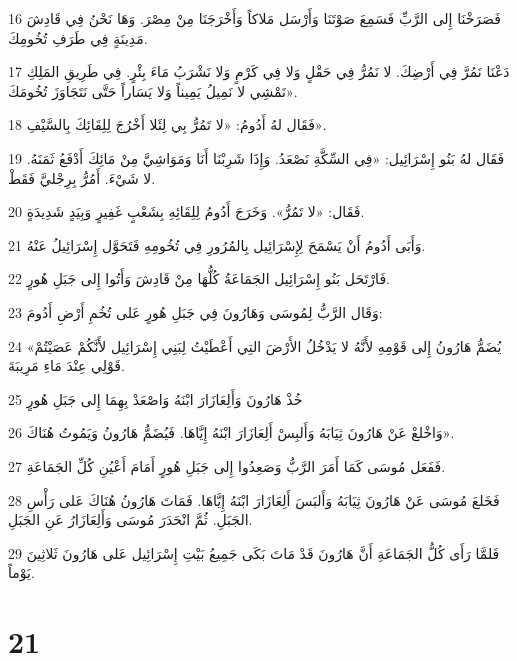 \par 16 فَصَرَخْنَا إِلى الرَّبِّ فَسَمِعَ صَوْتَنَا وَأَرْسَل مَلاكاً وَأَخْرَجَنَا مِنْ مِصْرَ. وَهَا نَحْنُ فِي قَادِشَ مَدِينَةٍ فِي طَرَفِ تُخُومِكَ.
\par 17 دَعْنَا نَمُرَّ فِي أَرْضِكَ. لا نَمُرُّ فِي حَقْلٍ وَلا فِي كَرْمٍ وَلا نَشْرَبُ مَاءَ بِئْرٍ. فِي طَرِيقِ المَلِكِ نَمْشِي لا نَمِيلُ يَمِيناً وَلا يَسَاراً حَتَّى نَتَجَاوَزَ تُخُومَكَ».
\par 18 فَقَال لهُ أَدُومُ: «لا تَمُرُّ بِي لِئَلا أَخْرُجَ لِلِقَائِكَ بِالسَّيْفِ».
\par 19 فَقَال لهُ بَنُو إِسْرَائِيل: «فِي السِّكَّةِ نَصْعَدُ. وَإِذَا شَرِبْنَا أَنَا وَمَوَاشِيَّ مِنْ مَائِكَ أَدْفَعُ ثَمَنَهُ. لا شَيْءَ. أَمُرُّ بِرِجْليَّ فَقَطْ.
\par 20 فَقَال: «لا تَمُرُّ». وَخَرَجَ أَدُومُ لِلِقَائِهِ بِشَعْبٍ غَفِيرٍ وَبِيَدٍ شَدِيدَةٍ.
\par 21 وَأَبَى أَدُومُ أَنْ يَسْمَحَ لِإِسْرَائِيل بِالمُرُورِ فِي تُخُومِهِ فَتَحَوَّل إِسْرَائِيلُ عَنْهُ.
\par 22 فَارْتَحَل بَنُو إِسْرَائِيل الجَمَاعَةُ كُلُّهَا مِنْ قَادِشَ وَأَتُوا إِلى جَبَلِ هُورٍ.
\par 23 وَقَال الرَّبُّ لِمُوسَى وَهَارُونَ فِي جَبَلِ هُورٍ عَلى تُخُمِ أَرْضِ أَدُومَ:
\par 24 «يُضَمُّ هَارُونُ إِلى قَوْمِهِ لأَنَّهُ لا يَدْخُلُ الأَرْضَ التِي أَعْطَيْتُ لِبَنِي إِسْرَائِيل لأَنَّكُمْ عَصَيْتُمْ قَوْلِي عِنْدَ مَاءِ مَرِيبَةَ.
\par 25 خُذْ هَارُونَ وَأَلِعَازَارَ ابْنَهُ وَاصْعَدْ بِهِمَا إِلى جَبَلِ هُورٍ
\par 26 وَاخْلعْ عَنْ هَارُونَ ثِيَابَهُ وَأَلبِسْ أَلِعَازَارَ ابْنَهُ إِيَّاهَا. فَيُضَمُّ هَارُونُ وَيَمُوتُ هُنَاكَ».
\par 27 فَفَعَل مُوسَى كَمَا أَمَرَ الرَّبُّ وَصَعِدُوا إِلى جَبَلِ هُورٍ أَمَامَ أَعْيُنِ كُلِّ الجَمَاعَةِ.
\par 28 فَخَلعَ مُوسَى عَنْ هَارُونَ ثِيَابَهُ وَأَلبَسَ أَلِعَازَارَ ابْنَهُ إِيَّاهَا. فَمَاتَ هَارُونُ هُنَاكَ عَلى رَأْسِ الجَبَلِ. ثُمَّ انْحَدَرَ مُوسَى وَأَلِعَازَارُ عَنِ الجَبَلِ.
\par 29 فَلمَّا رَأَى كُلُّ الجَمَاعَةِ أَنَّ هَارُونَ قَدْ مَاتَ بَكَى جَمِيعُ بَيْتِ إِسْرَائِيل عَلى هَارُونَ ثَلاثِينَ يَوْماً.

\chapter{21}

